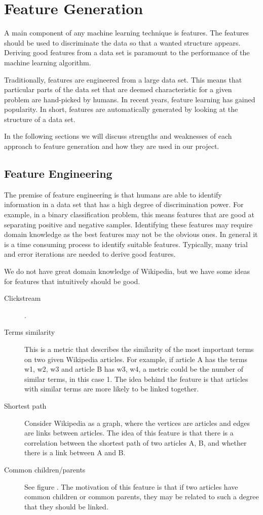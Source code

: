 \section{Feature Generation}
A main component of any machine learning technique is features. The features should be used to discriminate the data so that a wanted structure appears. Deriving good features from a data set is paramount to the performance of the machine learning algorithm.

Traditionally, features are engineered from a large data set. This means that particular parts of the data set that are deemed characteristic for a given problem are hand-picked by humans. In recent years, feature learning has gained popularity. In short, features are automatically generated by looking at the structure of a data set.

In the following sections we will discuss strengths and weaknesses of each approach to feature generation and how they are used in our project.

\subsection{Feature Engineering}
The premise of feature engineering is that humans are able to identify information in a data set that has a high degree of discrimination power. For example, in a binary classification problem, this means features that are good at separating positive and negative samples. Identifying these features may require domain knowledge as the best features may not be the obvious ones. In general it is a time consuming process to identify suitable features. Typically, many trial and error iterations are needed to derive good features.

We do not have great domain knowledge of Wikipedia, but we have some ideas for features that intuitively should be good.

\begin{description}
    \item[Clickstream] .
    \item[Terms similarity] This is a metric that describes the similarity of the most important terms on two given Wikipedia articles. For example, if article A has the terms w1, w2, w3 and article B has w3, w4, a metric could be the number of similar terms, in this case 1. The idea behind the feature is that articles with similar terms are more likely to be linked together.
    \item[Shortest path] Consider Wikipedia as a graph, where the vertices are articles and edges are links between articles. The idea of this feature is that there is a correlation between the shortest path of two articles A, B, and whether there is a link between A and B. 
    \item[Common children/parents] See figure . The motivation of this feature is that if two articles have common children or common parents, they may be related to such a degree that they should be linked.
\end{description}


